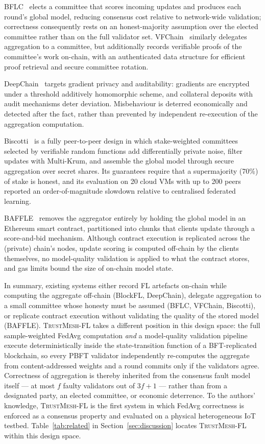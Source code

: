 \documentclass[lettersize,journal]{IEEEtran}
\newcommand{\tmfl}{\textsc{TrustMesh-FL}}
\begin{document}
BFLC~\cite{li2021bflc} elects a committee that scores incoming updates and produces
each round's global model, reducing consensus cost relative to network-wide validation;
correctness consequently rests on an honest-majority assumption over the elected
committee rather than on the full validator set. VFChain~\cite{peng2022vfchain}
similarly delegates aggregation to a committee, but additionally records verifiable
proofs of the committee's work on-chain, with an authenticated data structure for
efficient proof retrieval and secure committee rotation.

DeepChain~\cite{weng2021deepchain} targets gradient privacy and auditability: gradients
are encrypted under a threshold additively homomorphic scheme, and collateral deposits
with audit mechanisms deter deviation. Misbehaviour is deterred economically and
detected after the fact, rather than prevented by independent re-execution of the
aggregation computation.

Biscotti~\cite{shayan2021biscotti} is a fully peer-to-peer design in which
stake-weighted committees selected by verifiable random functions add differentially
private noise, filter updates with Multi-Krum, and assemble the global model through
secure aggregation over secret shares. Its guarantees require that a supermajority
(70\%) of stake is honest, and its evaluation on 20 cloud VMs with up to 200 peers
reported an order-of-magnitude slowdown relative to centralised federated learning.

BAFFLE~\cite{ramanan2020baffle} removes the aggregator entirely by holding the global
model in an Ethereum smart contract, partitioned into chunks that clients update through
a score-and-bid mechanism. Although contract execution is replicated across the
(private) chain's nodes, update scoring is computed off-chain by the clients themselves,
no model-quality validation is applied to what the contract stores, and gas limits bound
the size of on-chain model state.

In summary, existing systems either record FL artefacts on-chain while computing the
aggregate off-chain (BlockFL, DeepChain), delegate aggregation to a small committee
whose honesty must be assumed (BFLC, VFChain, Biscotti), or replicate contract
execution without validating the quality of the stored model (BAFFLE). \tmfl{} takes a
different position in this design space: the full sample-weighted FedAvg computation
\emph{and} a model-quality validation pipeline execute deterministically inside the
state-transition function of a BFT-replicated blockchain, so every PBFT validator
independently re-computes the aggregate from content-addressed weights and a round
commits only if the validators agree. Correctness of aggregation is thereby inherited
from the consensus fault model itself --- at most $f$ faulty validators out of
$3f{+}1$ --- rather than from a designated party, an elected committee, or economic
deterrence. To the authors' knowledge, \tmfl{} is the first system in which FedAvg
correctness is enforced as a consensus property and evaluated on a physical
heterogeneous IoT testbed. Table~\ref{tab:related} in
Section~\ref{sec:discussion} locates \tmfl{} within this design space.
\end{document}
